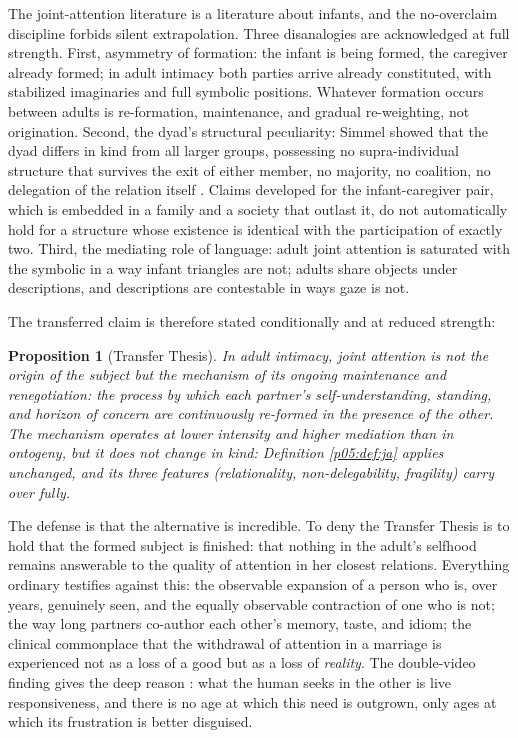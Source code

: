 \documentclass[11pt,a4paper]{article}
\theoremstyle{seriesthm}
\newtheorem{prop}{Proposition}
\begin{document}
The joint-attention literature is a literature about infants, and the no-overclaim discipline forbids silent extrapolation. Three disanalogies are acknowledged at full strength. First, asymmetry of formation: the infant is being formed, the caregiver already formed; in adult intimacy both parties arrive already constituted, with stabilized imaginaries and full symbolic positions. Whatever formation occurs between adults is re-formation, maintenance, and gradual re-weighting, not origination. Second, the dyad's structural peculiarity: Simmel showed that the dyad differs in kind from all larger groups, possessing no supra-individual structure that survives the exit of either member, no majority, no coalition, no delegation of the relation itself \parencite{simmel1950}. Claims developed for the infant-caregiver pair, which is embedded in a family and a society that outlast it, do not automatically hold for a structure whose existence is identical with the participation of exactly two. Third, the mediating role of language: adult joint attention is saturated with the symbolic in a way infant triangles are not; adults share objects under descriptions, and descriptions are contestable in ways gaze is not.

The transferred claim is therefore stated conditionally and at reduced strength:

\begin{prop}[Transfer Thesis]\label{p05:prop:transfer}
In adult intimacy, joint attention is not the origin of the subject but the mechanism of its ongoing maintenance and renegotiation: the process by which each partner's self-understanding, standing, and horizon of concern are continuously re-formed in the presence of the other. The mechanism operates at lower intensity and higher mediation than in ontogeny, but it does not change in kind: Definition \ref{p05:def:ja} applies unchanged, and its three features (relationality, non-delegability, fragility) carry over fully.
\end{prop}

The defense is that the alternative is incredible. To deny the Transfer Thesis is to hold that the formed subject is finished: that nothing in the adult's selfhood remains answerable to the quality of attention in her closest relations. Everything ordinary testifies against this: the observable expansion of a person who is, over years, genuinely seen, and the equally observable contraction of one who is not; the way long partners co-author each other's memory, taste, and idiom; the clinical commonplace that the withdrawal of attention in a marriage is experienced not as a loss of a good but as a loss of \emph{reality}. The double-video finding gives the deep reason \parencite{murray1985}: what the human seeks in the other is live responsiveness, and there is no age at which this need is outgrown, only ages at which its frustration is better disguised.
\end{document}

